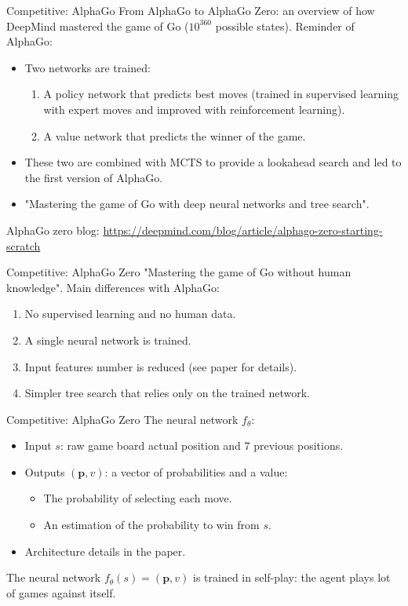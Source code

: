 \documentclass[9pt, hyperref={pdfusetitle,colorlinks=true,allcolors=DarkBlue}]{beamer}
\begin{document}
\begin{frame}{Competitive: AlphaGo}
From AlphaGo to AlphaGo Zero: an overview of how DeepMind mastered the game of Go ($10^{360}$ possible states).
\vfill
Reminder of AlphaGo:
\begin{itemize}
    \item Two networks are trained:
    \begin{enumerate}
        \item A policy network that predicts best moves (trained in supervised learning with expert moves and improved with reinforcement learning).
        \item A value network that predicts the winner of the game.
    \end{enumerate}
    \vfill
    \item These two are combined with MCTS to provide a lookahead search and led to the first version of AlphaGo.
    \vfill
    \item "Mastering the game of Go with deep neural networks and tree search".
\end{itemize}
 \vfill
AlphaGo zero blog: \url{https://deepmind.com/blog/article/alphago-zero-starting-scratch}
\end{frame}

\begin{frame}{Competitive: AlphaGo Zero}
"Mastering the game of Go without human knowledge".
\vfill
Main differences with AlphaGo:
\vfill
\begin{enumerate}
    \item No supervised learning and no human data.
    \vfill
    \item A single neural network is trained.
    \vfill
    \item Input features number is reduced (see paper for details).
    \vfill
    \item Simpler tree search that relies only on the trained network.
    \vfill
\end{enumerate}

\end{frame}

\begin{frame}{Competitive: AlphaGo Zero}
The neural network $f_\theta$:
\vfill
\begin{itemize}
    \item Input $s$: raw game board actual position and 7 previous positions.
    \vfill
    \item Outputs $(\bm{p}, v)$: a vector of probabilities and a value:
    \begin{itemize}
        \item The probability of selecting each move.
        
        \item An estimation of the probability to win from $s$.
    \end{itemize}
    \vfill
    \item Architecture details in the paper.
    \vfill
\end{itemize}
The neural network $f_\theta(s)=(\bm{p}, v)$ is trained in self-play: the agent plays lot of games against itself.
\end{frame}
\end{document}
